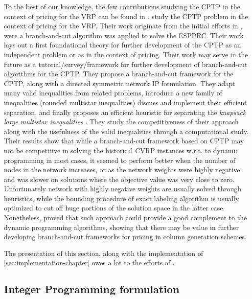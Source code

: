 To the best of our knowledge, the few contributions studying the CPTP
in the context of pricing for the VRP can be found in \textcite{bixby1999, jepsen2011,jepsen2014}.
\textcite{jepsen2014} study the CPTP problem in the context of pricing for the VRP.
Their work originate from the initial efforts in \textcite{jepsen2008},
were a branch-and-cut algorithm was applied to solve the ESPPRC.
Their work lays out a first foundational theory for further development
of the CPTP as an independent problem or as in the context of pricing.
Their work may serve in the future as a tutorial/survey/framework
for further development of branch-and-cut algorithms for the CPTP.
They propose a branch-and-cut framework for the CPTP,
along with a directed symmetric network IP formulation.
They adapt many valid inequalities from related problems,
introduce a new family of inequalities (rounded multistar inequalities)
discuss and implement their efficient separation,
and finally proposes an efficient heuristic for separating
the \textit{knapsack large multistar inequalities} \parencite{letchford2002}.
They study the competitiveness of their approach
along with the usefulness of the valid inequalities through a computational study.
Their results show that while a branch-and-cut framework based on CPTP may
not be competitive in solving the historical CVRP instances w.r.t. to dynamic programming in most cases,
it seemed to perform better when the number of nodes in the network increases,
or as the network weights were highly negative
and was slower on solutions where the objective value was very close to zero.
Unfortunately network with highly negative weights are usually
solved through heuristics,
while the bounding procedure of exact labeling algorithm is usually optimized
to cut off huge portions of the solution space in the latter case.
Nonetheless, \textcite{jepsen2014}
proved that such approach could provide a good complement
to the dynamic programming algorithms,
showing that there may be value in further developing
branch-and-cut frameworks for pricing in column generation schemes.

The presentation of this section, along with the implementation of \cref{sec:implementation-chapter}
owes a lot to the efforts of \textcite{jepsen2014}.

\subsection{Integer Programming formulation}
\label{sec:cptp-integer-programming-formulation}

